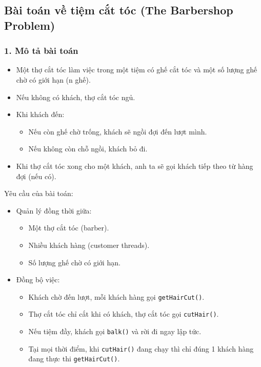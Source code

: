 \subsection{Bài toán về tiệm cắt tóc (The Barbershop Problem)}
\subsubsection*{1. Mô tả bài toán}
\begin{itemize}
    \item Một thợ cắt tóc làm việc trong một tiệm có ghế cắt tóc và một số lượng ghế chờ có giới hạn (n ghế).
    \item  Nếu không có khách, thợ cắt tóc ngủ.
    \item Khi khách đến:
    \begin{itemize}
        \item Nếu còn ghế chờ trống, khách sẽ ngồi đợi đến lượt mình.
        \item Nếu không còn chỗ ngồi, khách bỏ đi.
    \end{itemize}
    \item Khi thợ cắt tóc xong cho một khách, anh ta sẽ gọi khách tiếp theo từ hàng đợi (nếu có).
\end{itemize}

    Yêu cầu của bài toán:
\begin{itemize}
    \item Quản lý đồng thời giữa:
    \begin{itemize}
        \item Một thợ cắt tóc (barber).
        \item Nhiều khách hàng (customer threads).
        \item Số lượng ghế chờ có giới hạn.
    \end{itemize}
    \item Đồng bộ việc:
    \begin{itemize}
        \item Khách chờ đến lượt, mỗi khách hàng gọi \texttt{getHairCut()}.
        \item Thợ cắt tóc chỉ cắt khi có khách, thợ cắt tóc gọi \texttt{cutHair()}.
        \item Nếu tiệm đầy, khách gọi \texttt{balk()} và rời đi ngay lập tức.
        \item Tại mọi thời điểm, khi \texttt{cutHair()} đang chạy thì chỉ đúng 1 khách hàng đang thực thi \texttt{getHairCut()}.
    \end{itemize}
\end{itemize}
